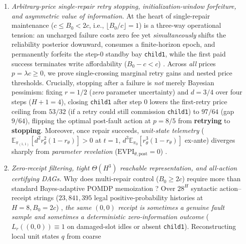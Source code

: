 \documentclass[11pt,letterpaper]{article}
\begin{document}
\begin{enumerate}
  genealogical store requires an explicit measure-preserving commutation
  bridge rather than defining a reduced POMDP by fiat.
\item
  \emph{Arbitrary-price single-repair retry stopping,
  initialization-window forfeiture, and asymmetric value of
  information.} At the heart of single-repair maintenance
  (\(c \le B_0 < 2c\), i.e., \(\lfloor B_0/c\rfloor = 1\)) is a
  three-way operational tension: an uncharged failure costs zero fee yet
  \emph{simultaneously} shifts the reliability posterior downward,
  consumes a finite-horizon epoch, and permanently forfeits the
  step-\(0\) standby bay \texttt{child1}, while the first paid success
  terminates write affordability (\(B_0 - c < c\))
  \citep{wald1947, raiffaSchlaifer1961, martin1967, degroot1970, berryFristedt1979, fristedtBerry1988, aghion1991, duff2002, ross2011, ghavamzadeh2015, barronYechiali2017}.
  Across \emph{all} prices \(p = \lambda c \ge 0\), we prove
  single-crossing marginal retry gains and nested price thresholds.
  Crucially, stopping after a failure is \emph{not} merely Bayesian
  pessimism: fixing \(r = 1/2\) (\emph{zero} parameter uncertainty) and
  \(d = 3/4\) over four steps (\(H + 1 = 4\)), closing \texttt{child1}
  after step \(0\) lowers the first-retry price ceiling from \(53/32\)
  (if a retry could still commission \texttt{child1}) to \(97/64\) (gap
  \(9/64\)), flipping the optimal post-fault action at \(p = 8/5\) from
  \textbf{retrying} to \textbf{stopping}. Moreover, once repair
  succeeds, \emph{unit-state telemetry}
  (\(\mathbb{E}_{\pi_{(1,1)}}[d^2 r_\theta^2(1 - r_\theta)] > 0\) at
  \(t=1\), \(d^3\mathbb{E}_{\pi_0}[r_\theta^3(1 - r_\theta)]\) ex-ante)
  diverges sharply from \emph{parameter revelation}
  (\(\mathrm{EVPI}_{\theta,\mathrm{post}} = 0\))
  \citep{blackwell1953, howard1966}.
\item
  \emph{Zero-receipt filtering, tight \(\Theta(H^3)\) reachable
  representation, and all-action certifying DAGs.} Why does multi-repair
  control (\(B_0 \ge 2c\)) require more than standard Bayes-adaptive
  POMDP memoization \citep{ross2011, meuleau1999, poupartBoutilier2003}?
  Over \(28^H\) syntactic action--receipt strings (\(23,841,395\) legal
  positive-probability histories at \(H=8, B_0=2c\))
  \citep{papadimitriouTsitsiklis1987, lovejoy1991, cassandra1997, kaelbling1998, madani2003},
  \emph{the same \((0,0)\) receipt is sometimes a genuine fault sample
  and sometimes a deterministic zero-information outcome}
  (\(L_r((0,0)) \equiv 1\) on damaged-slot idles or absent
  \texttt{child1}). Reconstructing local unit states \(q\) from coarse

\end{enumerate}
\end{document}
